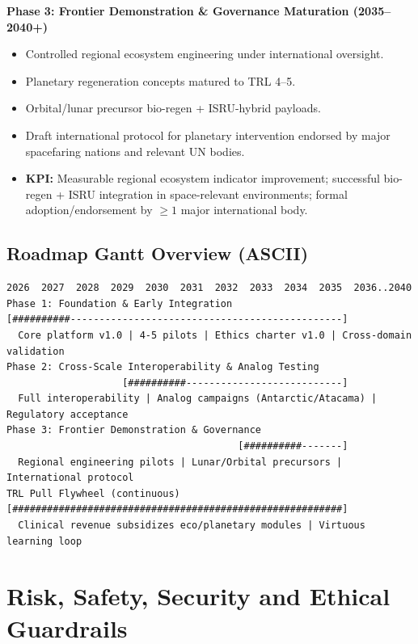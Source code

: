 \documentclass[11pt,a4paper]{report}
\begin{document}
\textbf{Phase 3: Frontier Demonstration \& Governance Maturation (2035--2040+)}
\begin{itemize}
    \item Controlled regional ecosystem engineering under international oversight.
    \item Planetary regeneration concepts matured to TRL 4--5.
    \item Orbital/lunar precursor bio-regen + ISRU-hybrid payloads.
    \item Draft international protocol for planetary intervention endorsed by major spacefaring nations and relevant UN bodies.
    \item \textbf{KPI:} Measurable regional ecosystem indicator improvement; successful bio-regen + ISRU integration in space-relevant environments; formal adoption/endorsement by $\geq 1$ major international body.
\end{itemize}

\section{Roadmap Gantt Overview (ASCII)}

\begin{lstlisting}[style=asciistyle, caption={High-Level Implementation Roadmap Gantt (2026--2040)}]
2026  2027  2028  2029  2030  2031  2032  2033  2034  2035  2036..2040
Phase 1: Foundation & Early Integration
[##########-----------------------------------------------]
  Core platform v1.0 | 4-5 pilots | Ethics charter v1.0 | Cross-domain validation
Phase 2: Cross-Scale Interoperability & Analog Testing
                    [##########---------------------------]
  Full interoperability | Analog campaigns (Antarctic/Atacama) | Regulatory acceptance
Phase 3: Frontier Demonstration & Governance
                                        [##########-------]
  Regional engineering pilots | Lunar/Orbital precursors | International protocol
TRL Pull Flywheel (continuous)
[#########################################################]
  Clinical revenue subsidizes eco/planetary modules | Virtuous learning loop
\end{lstlisting}

\chapter{Risk, Safety, Security and Ethical Guardrails}
\end{document}
